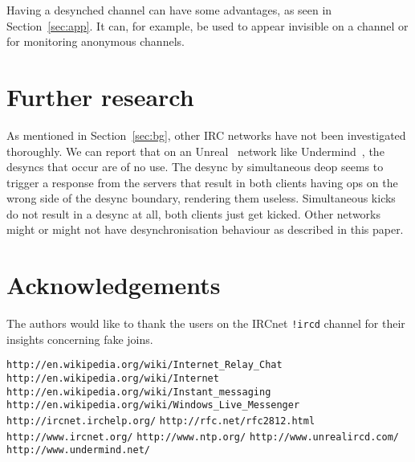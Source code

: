 \documentclass{article}
\theoremstyle{definition}
\begin{document}
Having a desynched channel can have some advantages, as seen in
Section~\ref{sec:app}. It can, for example, be used to appear invisible on a
channel or for monitoring anonymous channels.

\section{Further research} \label{sec:further}
As mentioned in Section~\ref{sec:bg}, other IRC networks have not been
investigated thoroughly. We can report that on an Unreal~\cite{UNR} network
like Undermind~\cite{UND}, the desyncs that occur are of no use. The desync by
simultaneous deop seems to trigger a response from the servers that result in
both clients having ops on the wrong side of the desync boundary, rendering
them useless. Simultaneous kicks do not result in a desync at all, both clients
just get kicked. Other networks might or might not have desynchronisation
behaviour as described in this paper.

\section{Acknowledgements} \label{sec:ack}
The authors would like to thank the users on the IRCnet \verb#!ircd# channel
for their insights concerning fake joins.

\begin{thebibliography}{XX}
 \verb#http://en.wikipedia.org/wiki/Internet_Relay_Chat#
 \verb#http://en.wikipedia.org/wiki/Internet#
 \verb#http://en.wikipedia.org/wiki/Instant_messaging#
 \verb#http://en.wikipedia.org/wiki/Windows_Live_Messenger#
 \verb#http://ircnet.irchelp.org/#
 \verb#http://rfc.net/rfc2812.html#
 \verb#http://www.ircnet.org/#
 \verb#http://www.ntp.org/#
 \verb#http://www.unrealircd.com/#
 \verb#http://www.undermind.net/#
\end{thebibliography}
\end{document}
